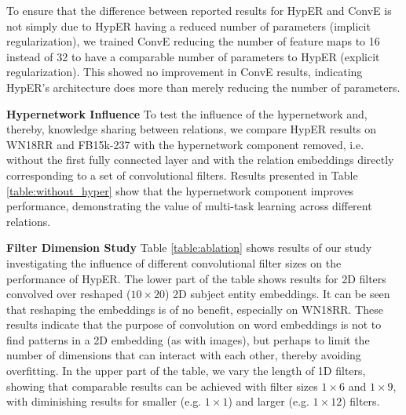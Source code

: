 \documentclass[runningheads]{llncs}
\newcommand{\keypoint}[1]{\vspace{0.1cm}\noindent\textbf{#1}\quad}
\begin{document}
 To ensure that the difference between reported results for HypER and ConvE is not simply due to HypER having a reduced number of parameters (implicit regularization), we trained ConvE reducing the number of feature maps to 16 instead of 32 to have a comparable number of parameters to HypER (explicit regularization). This showed no improvement in ConvE results, indicating HypER's architecture does more than merely reducing the number of parameters.

\begin{table}[!ht]
	\centering
	\caption{Results with and without hypernetwork on WN18RR and FB15k-237.}
    \label{table:without_hyper}
    \vspace{-0.8cm}
 \end{table}
\keypoint{Hypernetwork Influence} To test the influence of the hypernetwork and, thereby, knowledge sharing between relations, we compare HypER results on WN18RR and FB15k-237 with the hypernetwork component removed, i.e. without the first fully connected layer and with the relation embeddings directly corresponding to a set of convolutional filters. Results presented in Table \ref{table:without_hyper} show that the hypernetwork component improves performance, demonstrating the value of multi-task learning across different relations.

\keypoint{Filter Dimension Study} Table \ref{table:ablation} shows results of our study investigating the influence of different convolutional filter sizes on the performance of HypER. The lower part of the table shows results for 2D filters convolved over reshaped ($10 \times 20$) 2D subject entity embeddings. It can be seen that reshaping the embeddings is of no benefit, especially on WN18RR. These results indicate that the purpose of convolution on word embeddings is not to find patterns in a 2D embedding (as with images), but perhaps to limit the number of dimensions that can interact with each other, thereby avoiding overfitting. In the upper part of the table, we vary the length of 1D filters, showing that comparable results can be achieved with filter sizes $1 \times 6$ and $1 \times 9$, with diminishing results for smaller (e.g. $1 \times 1$) and larger (e.g. $1 \times 12$) filters. 
\end{document}
